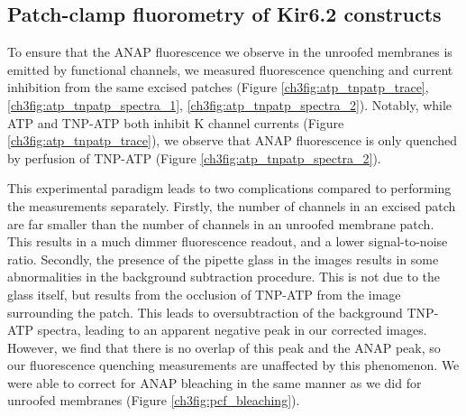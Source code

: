 \subsection{Patch-clamp fluorometry of Kir6.2 constructs}

To ensure that the ANAP fluorescence we observe in the unroofed membranes is emitted by functional channels, we measured fluorescence quenching and current inhibition from the same excised patches (Figure \ref{ch3fig:atp_tnpatp_trace}, \ref{ch3fig:atp_tnpatp_spectra_1}, \ref{ch3fig:atp_tnpatp_spectra_2}).
Notably, while ATP and TNP-ATP both inhibit K\ATP{} channel currents (Figure \ref{ch3fig:atp_tnpatp_trace}), we observe that ANAP fluorescence is only quenched by perfusion of TNP-ATP (Figure \ref{ch3fig:atp_tnpatp_spectra_2}).

This experimental paradigm leads to two complications compared to performing the measurements separately.
Firstly, the number of channels in an excised patch are far smaller than the number of channels in an unroofed membrane patch.
This results in a much dimmer fluorescence readout, and a lower signal-to-noise ratio.
Secondly, the presence of the pipette glass in the images results in some abnormalities in the background subtraction procedure.
This is not due to the glass itself, but results from the occlusion of TNP-ATP from the image surrounding the patch.
This leads to oversubtraction of the background TNP-ATP spectra, leading to an apparent negative peak in our corrected images.
However, we find that there is no overlap of this peak and the ANAP peak, so our fluorescence quenching measurements are unaffected by this phenomenon.
We were able to correct for ANAP bleaching in the same manner as we did for unroofed membranes (Figure \ref{ch3fig:pcf_bleaching}).

